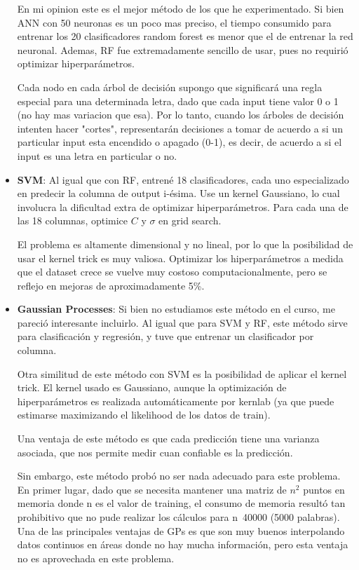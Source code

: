 \documentclass[paper=a4, fontsize=11pt]{scrartcl} %
\numberwithin{equation}{section} %
\numberwithin{figure}{section} %
\numberwithin{table}{section} %
\begin{document}
\begin{itemize}
En mi opinion este es el mejor método de los que he experimentado. Si bien ANN con 50 neuronas es un poco mas preciso, el tiempo consumido para entrenar los 20 clasificadores random forest es menor que el de entrenar la red neuronal. Ademas, RF fue extremadamente sencillo de usar, pues no requirió optimizar hiperparámetros.

Cada nodo en cada árbol de decisión supongo que significará una regla especial para una determinada letra, dado que cada input tiene valor 0 o 1 (no hay mas variacion que esa). Por lo tanto, cuando los árboles de decisión intenten hacer "cortes", representarán decisiones a tomar de acuerdo a si un particular input esta encendido o apagado (0-1), es decir, de acuerdo a si el input es una letra en particular o no.

\item \textbf{SVM}: Al igual que con RF, entrené 18 clasificadores, cada uno especializado en predecir la columna de output i-ésima. Use un kernel Gaussiano, lo cual involucra la dificultad extra de optimizar hiperparámetros. Para cada una de las 18 columnas, optimice $C$ y $\sigma$ en grid search.

El problema es altamente dimensional y no lineal, por lo que la posibilidad de usar el kernel trick es muy valiosa. Optimizar los hiperparámetros a medida que el dataset crece se vuelve muy costoso computacionalmente, pero se reflejo en mejoras de aproximadamente 5\%.

\item \textbf{Gaussian Processes}: Si bien no estudiamos este método en el curso, me pareció interesante incluirlo\cite{gauss_processes}. Al igual que para SVM y RF, este método sirve para clasificación y regresión, y tuve que entrenar un clasificador por columna. 

Otra similitud de este método con SVM es la posibilidad de aplicar el kernel trick. El kernel usado es Gaussiano, aunque la optimización de hiperparámetros es realizada automáticamente por kernlab (ya que puede estimarse maximizando el likelihood de los datos de train).

Una ventaja de este método es que cada predicción tiene una varianza asociada, que nos permite medir cuan confiable es la predicción.

Sin embargo, este método probó no ser nada adecuado para este problema. En primer lugar, dado que se necesita mantener una matriz de $n^2$ puntos en memoria donde n es el valor de training, el consumo de memoria resultó tan prohibitivo que no pude realizar los cálculos para n~40000 (5000 palabras). Una de las principales ventajas de GPs es que son muy buenos interpolando datos continuos en áreas donde no hay mucha información, pero esta ventaja no es aprovechada en este problema.


\end{itemize}
\end{document}
